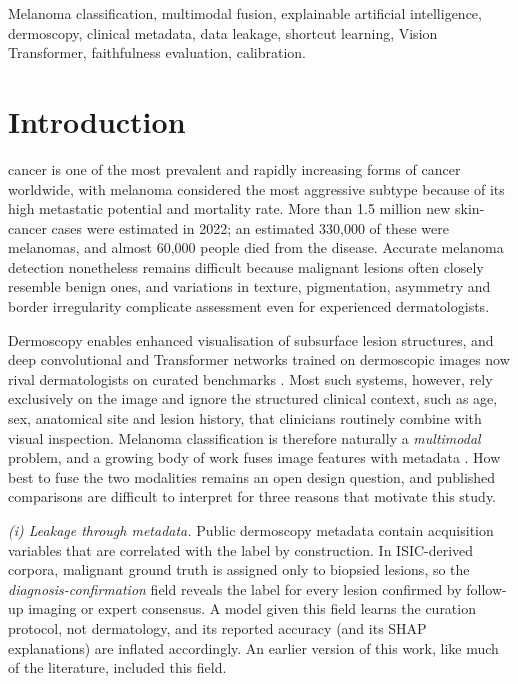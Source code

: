 \documentclass[journal]{IEEEtran}
\begin{document}
\begin{IEEEkeywords}
Melanoma classification, multimodal fusion, explainable artificial intelligence, dermoscopy, clinical metadata, data leakage, shortcut learning, Vision Transformer, faithfulness evaluation, calibration.
\end{IEEEkeywords}

\section{Introduction}
 cancer is one of the most prevalent and rapidly increasing forms of cancer worldwide, with melanoma considered the most aggressive subtype because of its high metastatic potential and mortality rate. More than 1.5 million new skin-cancer cases were estimated in 2022; an estimated 330,000 of these were melanomas, and almost 60,000 people died from the disease. Accurate melanoma detection nonetheless remains difficult because malignant lesions often closely resemble benign ones, and variations in texture, pigmentation, asymmetry and border irregularity complicate assessment even for experienced dermatologists.

Dermoscopy enables enhanced visualisation of subsurface lesion structures, and deep convolutional and Transformer networks trained on dermoscopic images now rival dermatologists on curated benchmarks \cite{esteva2017,haenssle2018}. Most such systems, however, rely exclusively on the image and ignore the structured clinical context, such as age, sex, anatomical site and lesion history, that clinicians routinely combine with visual inspection. Melanoma classification is therefore naturally a \emph{multimodal} problem, and a growing body of work fuses image features with metadata \cite{ahammed2025,aksoy2025}. How best to fuse the two modalities remains an open design question, and published comparisons are difficult to interpret for three reasons that motivate this study.

\textit{(i) Leakage through metadata.} Public dermoscopy metadata contain acquisition variables that are correlated with the label by construction. In ISIC-derived corpora, malignant ground truth is assigned only to biopsied lesions, so the \emph{diagnosis-confirmation} field reveals the label for every lesion confirmed by follow-up imaging or expert consensus. A model given this field learns the curation protocol, not dermatology, and its reported accuracy (and its SHAP explanations) are inflated accordingly. An earlier version of this work, like much of the literature, included this field.
\end{document}
